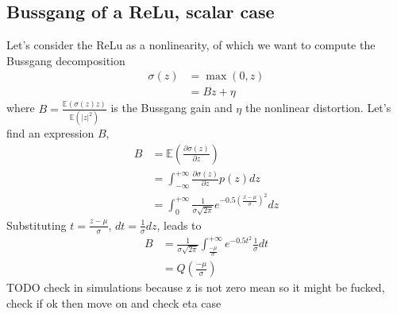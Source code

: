 \documentclass[12pt]{article}
\newcommand{\TODO}[1]{{\color{red} TODO {#1}}}
\newcommand{\expt}[1]{\mathbb{E}\left(#1\right)}
\theoremstyle{remark}
\begin{document}
\subsection{Bussgang of a ReLu, scalar case}
Let's consider the ReLu as a nonlinearity, of which we want to compute the Bussgang decomposition
\begin{align}
	\sigma(z) &= \max (0, z) \\
	&= Bz + \eta
\end{align}
where $B=\frac{\expt{\sigma(z)z}}{\expt{|z|^2}}$ is the Bussgang gain and $\eta$ the nonlinear distortion. 
Let's find an expression $B$, 
\begin{align}
	B &= \expt{\frac{\partial\sigma(z)}{\partial z}}\\
	&= \int_{-\infty}^{+\infty} \frac{\partial\sigma(z)}{\partial z} p(z) dz\\
	&= \int_{0}^{+\infty} \frac{1}{\sigma \sqrt{2\pi}} e^{-0.5 (\frac{x-\mu}{\sigma})^2} dz
\end{align}
Substituting $t = \frac{z-\mu}{\sigma}$, $dt = \frac{1}{\sigma}dz$, leads to 
\begin{align}
	B &=  \frac{1}{\sigma \sqrt{2\pi}} \int_{\frac{-\mu}{\sigma}}^{+\infty} e^{-0.5 t^2} \frac{1}{\sigma}dt\\
	&= Q\left(\frac{-\mu}{\sigma}\right)
\end{align}
\TODO{check in simulations because z is not zero mean so it might be fucked, check if ok then move on and check eta case}
\end{document}
